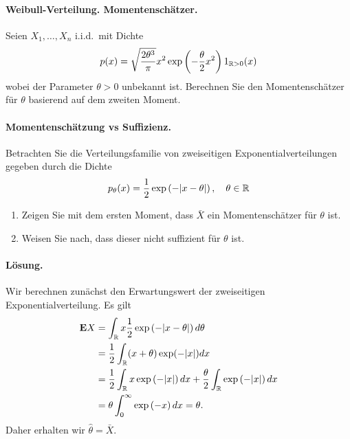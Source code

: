 
\paragraph{Weibull-Verteilung. Momentenschätzer.} Seien 
$X_1,\ldots,X_n$ i.i.d.\ mit Dichte 
\begin{equation*}
	p(x) = \sqrt{ \frac{2 \theta^3}{\pi} } x^2 \exp\left( - \frac{\theta}{2}x^2 \right) 1_{\mathbb R>0}(x)
\end{equation*}
wobei der Parameter $\theta>0$ unbekannt ist. Berechnen Sie den Momentenschätzer für $\theta$
basierend auf dem zweiten Moment. 

\paragraph{Momentenschätzung vs Suffizienz.}   Betrachten 
Sie die Verteilungsfamilie von zweiseitigen Exponentialverteilungen
gegeben durch die Dichte
\begin{equation*}
	p_\theta(x) = \frac{1}{2} \exp\left( -| x- \theta | \right), \quad \theta\in\mathbb R
\end{equation*}
\begin{enumerate}
    \item Zeigen Sie mit dem ersten Moment, dass $\bar X$ ein Momentenschätzer
        für $\theta$ ist.
    \item Weisen Sie nach, dass dieser nicht suffizient für $\theta$ ist.
\end{enumerate}

\paragraph*{Lösung.} Wir berechnen zunächst den Erwartungswert der zweiseitigen
Exponentialverteilung. Es gilt
\begin{align*}
    \mathbf{E} X &= \int_{\mathbb R}^{} x \frac{1}{2} \exp \left( -| x-\theta| \right) d\theta \\
    &= \frac{1}{2} \int_{\mathbb R}^{} (x+\theta) \exp ( -|x|) dx \\
    &= \frac{1}{2} \int_{\mathbb R} x \exp \left( -|x| \right) dx + 
        \frac{\theta}{2} \int_{\mathbb R} \exp \left( -|x| \right) dx \\
        &= \theta \int_{0}^{\infty} \exp \left( -x \right) dx = \theta.
\end{align*}
Daher erhalten wir $\hat \theta = \bar X$. 


